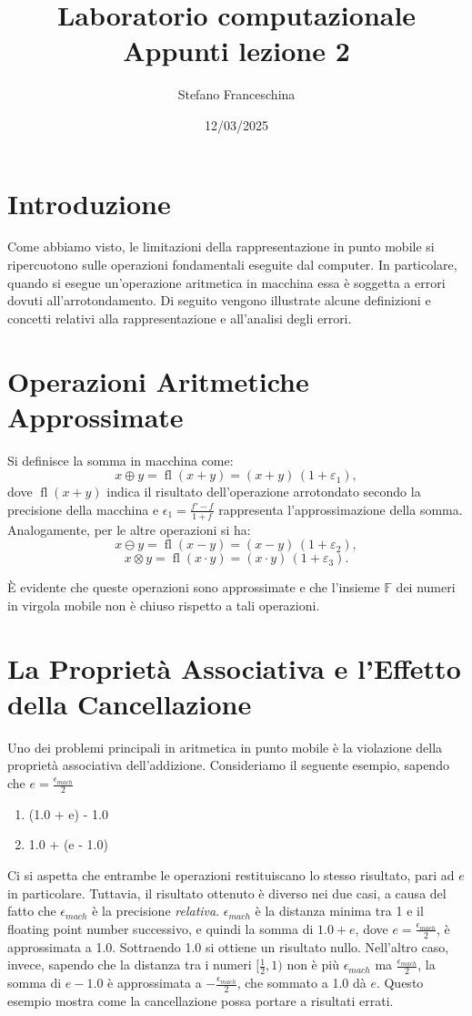 \documentclass[letterpaper,12pt]{article}
\title{Laboratorio computazionale \\[1ex] \large Appunti lezione 2}
\author{Stefano Franceschina}
\date{12/03/2025}
\newcommand{\numberset}{\mathbb}
\newcommand{\F}{\numberset{F}}
\begin{document}
\maketitle

\section*{Introduzione}

Come abbiamo visto, le limitazioni della rappresentazione in punto mobile si ripercuotono sulle operazioni fondamentali 
eseguite dal computer. In particolare, quando si esegue un'operazione aritmetica in macchina essa è soggetta a errori 
dovuti all'arrotondamento. Di seguito vengono illustrate alcune definizioni e concetti relativi alla rappresentazione e 
all'analisi degli errori.

\section*{Operazioni Aritmetiche Approssimate}

Si definisce la somma in macchina come:
\[
x \oplus y = \operatorname{fl}(x+y) = (x+y)\,(1+\varepsilon_1),
\]
dove $\operatorname{fl}(x+y)$ indica il risultato dell'operazione arrotondato secondo la precisione della macchina 
e $\epsilon_1 = \frac{f'-f}{1+f}$ rappresenta l'approssimazione della somma. Analogamente, per le altre operazioni si ha:
\[
x \ominus y = \operatorname{fl}(x-y) = (x-y)\,(1+\varepsilon_2),
\]
\[
x \otimes y = \operatorname{fl}(x\cdot y) = (x\cdot y)\,(1+\varepsilon_3).
\]

È evidente che queste operazioni sono approssimate e che l'insieme $\F$ dei numeri in virgola mobile non è chiuso rispetto 
a tali operazioni.

\section*{La Proprietà Associativa e l'Effetto della Cancellazione}

Uno dei problemi principali in aritmetica in punto mobile è la violazione della proprietà associativa dell'addizione. 
Consideriamo il seguente esempio, sapendo che $e = \frac{\epsilon_{mach}}{2}$
\begin{enumerate}
    \item (1.0 + e) - 1.0
    \item 1.0 + (e - 1.0)
\end{enumerate}
Ci si aspetta che entrambe le operazioni restituiscano lo stesso risultato, pari ad $e$ in particolare. Tuttavia, il 
risultato ottenuto è diverso nei due casi, a causa del fatto che $\epsilon_{mach}$ è la precisione \textit{relativa}. 
$\epsilon_{mach}$ è la distanza minima tra 1 e il floating
point number successivo, e quindi la somma di $1.0 + e$, dove $e = \frac{\epsilon_{mach}}{2}$, è approssimata a 1.0. 
Sottraendo 1.0 si ottiene un risultato nullo. Nell'altro caso, invece, sapendo che la distanza tra i numeri 
$[\frac{1}{2}, 1)$ non è più $\epsilon_{mach}$ ma $\frac{\epsilon_{mach}}{2} $, la somma di $e - 1.0$ è approssimata a
$-\frac{\epsilon_{mach}}{2}$, che sommato a 1.0 dà $e$.
Questo esempio mostra come la cancellazione possa portare a risultati errati.
\end{document}
